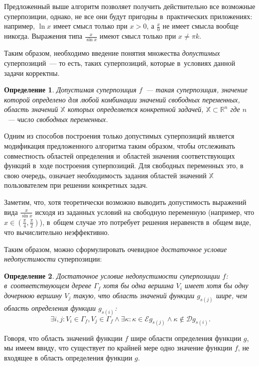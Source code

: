 \documentclass[12pt,a4paper]{article}
\newtheorem{defin}{Определение}
\begin{document}
Предложенный выше алгоритм позволяет получить действительно все возможные
суперпозиции, однако, не все они будут пригодны в~практических приложениях:
например, $\ln x$ имеет смысл только при $x > 0$, а $\frac{x}{0}$ не имеет
смысла вообще никогда. Выражения типа $\frac{x}{\sin x}$ имеют смысл только
при $x \neq \pi k$.

Таким образом, необходимо введение понятия множества \emph{допустимых}
суперпозиций~--- то есть, таких суперпозиций, которые в~условиях данной
задачи корректны.

\begin{defin}
  Допустимая суперпозиция $f$~--- такая суперпозиция, значение которой
  определено для любой комбинации значений свободных переменных, область
  значений $\mathbb{X}$ которых определяется конкретной задачей,
  $\mathbb{X} \subset \mathbb{R}^n$ где $n$~--- число свободных переменных.
\end{defin}

Одним из способов построения только допустимых суперпозиций является
модификация предложенного алгоритма таким образом, чтобы отслеживать
совместность областей определения и~областей значения соответствующих
функций в~ходе построения суперпозиций. Для свободных переменных это,
в свою очередь, означает необходимость задания областей значений
$\mathbb{X}$ пользователем при решении конкретных задач.

Заметим, что, хотя теоретически возможно выводить допустимость выражений
вида $\frac{x}{\sin x}$ исходя из заданных условий на свободную переменную
(например, что $x \in (\frac{\pi}{4}, \frac{\pi}{2})$), в~общем случае это
потребует решения неравенств в~общем виде, что вычислительно неэффективно.

Таким образом, можно сформулировать очевидное \emph{достаточное условие
недопустимости} суперпозиции:

\begin{defin}
  \label{defin:suff_not_allowed}
  Достаточное условие недопустимости суперпозиции $f$: в~соответствующем дереве
  $\Gamma_f$ хотя бы одна вершина $V_i$ имеет хотя бы одну дочернюю вершину
  $V_j$ такую, что область значений функции $g_{s(j)}$ шире, чем область
  определения функции $g_{s(i)}$:
  \[
  \exists i, j : V_i \in \Gamma_f, V_j \in \Gamma_f \wedge \exists \kappa :
	\kappa \in \mathcal{E} g_{s(j)} \wedge \kappa \notin \mathcal{D} g_{s(i)}.
  \]
\end{defin}

Говоря, что область значений функции $f$ шире области определения функции
$g$, мы имеем ввиду, что существует по крайней мере одно значение функции
$f$, не входящее в область определения функции $g$.
\end{document}
